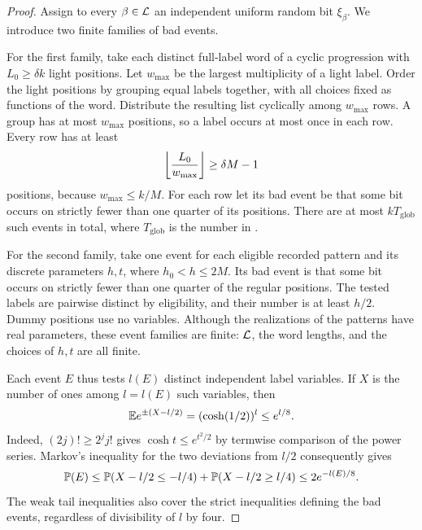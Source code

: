 \begin{proof}
Assign to every $\beta\in\mathcal L$ an independent uniform random bit
$\xi_\beta$. We introduce two finite families of bad events.

For the first family, take each distinct full-label word of a cyclic
progression with $L_0\ge\delta k$ light positions. Let $w_{\max}$
be the largest multiplicity of a light label. Order the light positions
by grouping equal labels together, with all choices fixed as functions
of the word. Distribute the resulting list cyclically among
$w_{\max}$ rows. A group has at most $w_{\max}$ positions, so a label
occurs at most once in each row. Every row has at least
\begin{equation}\label{outer:row-size}
 \left\lfloor\frac{L_0}{w_{\max}}\right\rfloor
 \ge\delta M-1
\end{equation}
positions, because $w_{\max}\le k/M$.
For each row let its bad event be that some bit occurs on strictly
fewer than one quarter of its positions. There are at most
$kT_{\mathrm{glob}}$ such events in total, where
$T_{\mathrm{glob}}$ is the number in .

For the second family, take one event for each eligible recorded
pattern and its discrete parameters $h,t$, where $h_0<h\le2M$.
Its bad event is that some bit occurs on strictly fewer than one
quarter of the regular positions. The tested labels are pairwise
distinct by eligibility, and their number is at least $h/2$.
Dummy positions use no variables. Although the realizations of the
patterns have real parameters, these event families are finite:
$\mathcal L$, the word lengths, and the choices of $h,t$ are all finite.

Each event $E$ thus tests $l(E)$ distinct independent label variables.
If $X$ is the number of ones among $l=l(E)$ such variables, then
\[
 \mathbb E e^{\pm(X-l/2)}=(\cosh(1/2))^l\le e^{l/8}.
\]
Indeed, $(2j)!\ge2^j j!$ gives
$\cosh t\le e^{t^2/2}$ by termwise comparison of the power series.
Markov's inequality for the two deviations from $l/2$ consequently gives
\begin{equation}\label{outer:tail}
 \mathbb P(E)
 \le\mathbb P(X-l/2\le-l/4)+\mathbb P(X-l/2\ge l/4)
 \le2e^{-l(E)/8}.
\end{equation}
The weak tail inequalities also cover the strict inequalities defining
the bad events, regardless of divisibility of $l$ by four.


\end{proof}
